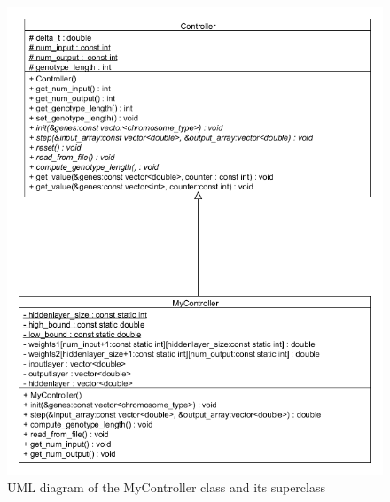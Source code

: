 \begin{figure}[h]
\centering
\includegraphics[scale=0.6]{Chapter2/images/controlle_uml.png}
\caption{UML diagram of the MyController class and its superclass}
\label{fig:controller_uml}
\end{figure}

